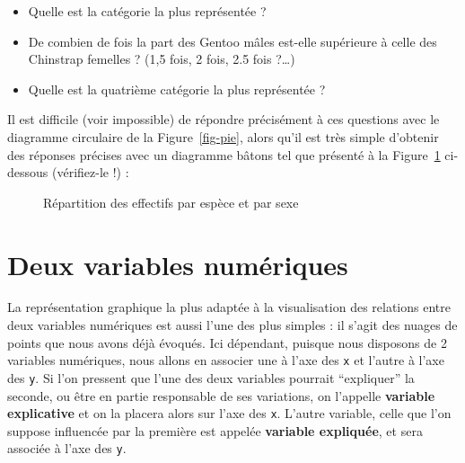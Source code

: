 \documentclass[
  a4paper,
  DIV=11,
  numbers=noendperiod,
  oneside]{scrreprt}
\providecommand{\tightlist}{%
  \setlength{\itemsep}{0pt}\setlength{\parskip}{0pt}}\usepackage{longtable,booktabs,array}
\begin{document}
\begin{itemize}
\tightlist
\item
  Quelle est la catégorie la plus représentée ?
\item
  De combien de fois la part des Gentoo mâles est-elle supérieure à
  celle des Chinstrap femelles ? (1,5 fois, 2 fois, 2.5 fois ?\ldots)
\item
  Quelle est la quatrième catégorie la plus représentée ?
\end{itemize}

Il est difficile (voir impossible) de répondre précisément à ces
questions avec le diagramme circulaire de la Figure~\ref{fig-pie}, alors
qu'il est très simple d'obtenir des réponses précises avec un diagramme
bâtons tel que présenté à la Figure~\ref{fig-bpspecies-sex} ci-dessous
(vérifiez-le !) :

\begin{figure}


\caption{\label{fig-bpspecies-sex}Répartition des effectifs par espèce
et par sexe}

\end{figure}%

\section{Deux variables numériques}\label{deux-variables-numuxe9riques}

La représentation graphique la plus adaptée à la visualisation des
relations entre deux variables numériques est aussi l'une des plus
simples : il s'agit des nuages de points que nous avons déjà évoqués.
Ici dépendant, puisque nous disposons de 2 variables numériques, nous
allons en associer une à l'axe des \texttt{x} et l'autre à l'axe des
\texttt{y}. Si l'on pressent que l'une des deux variables pourrait
``expliquer'' la seconde, ou être en partie responsable de ses
variations, on l'appelle \textbf{variable explicative} et on la placera
alors sur l'axe des \texttt{x}. L'autre variable, celle que l'on suppose
influencée par la première est appelée \textbf{variable expliquée}, et
sera associée à l'axe des \texttt{y}.
\end{document}
